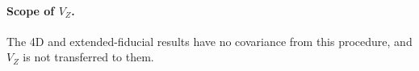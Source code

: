 \paragraph{Scope of $V_Z$.} The 4D and extended-fiducial results have no covariance from this procedure, and $V_Z$ is not transferred to them.


